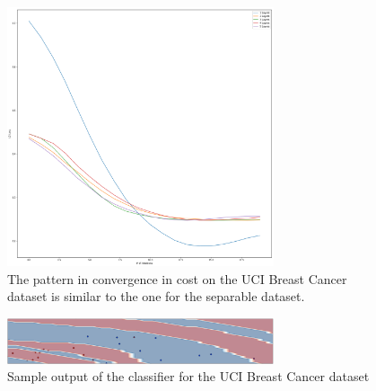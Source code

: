 \documentclass[main.tex]{subfiles}
\begin{document}
\begin{figure}[H]
\centering
\includegraphics[width=0.7\textwidth]{images/breast_cancer_layers}	
\caption{The pattern in convergence in cost on the UCI Breast Cancer dataset is similar to the one for the separable dataset.}
\end{figure}

\begin{figure}[H]
\centering
\includegraphics[width=0.7\textwidth]{images/practical_data_landscape}
\caption{Sample output of the classifier for the UCI Breast Cancer dataset}
\end{figure}



%
%
%
\end{document}
